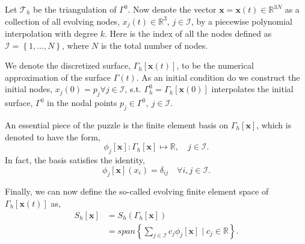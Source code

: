 Let $\mathcal{T}_{h}  $ be the triangulation of $\Gamma ^{0}$. Now denote the vector $ \mathbf{x} = \mathbf{x} \left( t \right)  \in \mathbb{R} ^{3N}$ as a collection of all evolving nodes, $x_{j}\left( t \right)  \in  \mathbb{R} ^3$, $j \in  \mathcal{I} $, by a piecewise polynomial interpolation
with degree $k$. Here is the index of all the nodes defined as $\mathcal{I} =\left\{ 1, \ldots, N \right\}  $, where $N$ is the total number of nodes.

We denote the discretized surface, $\Gamma _{h} \left[ \mathbf{x}\left( t \right)  \right] $, to be the numerical approximation of the surface $\Gamma \left( t \right) $. As an initial condition do we construct the initial nodes, $
 x_{j}( 0 )  = p_{j} \forall j \in  \mathcal{I}  $, s.t.
 $\Gamma _{h}^{0  } = \Gamma _{h} \left[ \mathbf{x}\left( 0 \right)   \right] $ interpolates the initial surface, $\Gamma ^{0}$ in the nodal points $p_{j} \in \Gamma ^{0}, \  j \in  \mathcal{I} $.

An essential piece of the puzzle is the finite element basis on $\Gamma _{h}\left[ \mathbf{x} \right] $, which is denoted to have the form,
\[
 \phi_{j} \left[ \mathbf{x} \right]: \Gamma_{h}\left[ \mathbf{x} \right] \mapsto \mathbb{R} , \quad   j \in  \mathcal{I} .
\]
In fact, the basis satisfies the identity, \[
\phi _{j} \left[ \mathbf{x} \right] \left( x_{i} \right)  = \delta _{ij} \quad \forall i,j \in  \mathcal{I} .
\]

Finally, we can now define the so-called evolving finite element space of $\Gamma _{h}\left[ \mathbf{x}\left( t \right)  \right] $ as, \[
    \begin{split}
S_{h}\left[ \mathbf{x} \right]   & = S_{h}\left( \Gamma _{h}\left[ \mathbf{x} \right]  \right) \\
 & = span\left\{ \sum_{j \in  \mathcal{I}  }^{}  c_{j} \phi _{j}\left[ \mathbf{x} \right]  \mid  c_{j} \in \mathbb{R}   \right\}.
    \end{split}
\]

